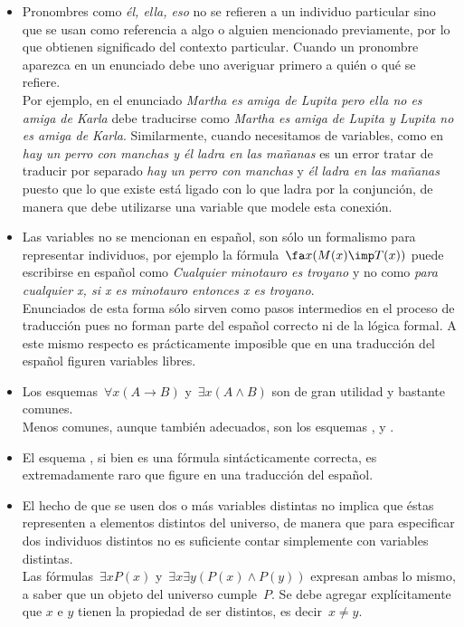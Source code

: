 \documentclass[11pt,letterpaper]{article}
\begin{document}
\begin{itemize}
 \item Pronombres como \textit{él, ella, eso} no se refieren a un individuo
  particular sino que se usan como referencia a algo o alguien mencionado 
  previamente, por lo que obtienen significado del contexto particular.
  Cuando un pronombre aparezca en un enunciado debe uno averiguar primero a 
  quién o qué se refiere. \\
  Por ejemplo, en el enunciado \textit{Martha es amiga de Lupita pero ella no 
es   amiga de Karla} debe traducirse como \textit{Martha es amiga de Lupita y 
  Lupita no es amiga de Karla}. Similarmente, cuando necesitamos de 
  variables, como en \textit{hay un perro con manchas y él ladra en las 
  mañanas} es un error tratar de traducir por separado \textit{hay un perro con
  manchas} y \textit{él ladra en las mañanas} puesto que lo que existe está
  ligado con lo que ladra por la conjunción, de manera que debe
  utilizarse una variable que modele esta conexión. 

 \item Las variables no se mencionan en español, son sólo un formalismo
  para representar individuos, por ejemplo la fórmula~$\fa x(M(x)\imp T(x))$ 
  puede escribirse en español como \textit{Cualquier minotauro es troyano} 
  y no como \textit{para cualquier x, si x es minotauro entonces x es 
  troyano}. \\
  Enunciados de esta forma sólo sirven como pasos intermedios en el proceso de 
  traducción pues no forman parte del español correcto ni de la lógica formal. 
  A este mismo respecto es prácticamente imposible que en una traducción del 
  español figuren variables libres.

 \item Los esquemas~$\forall x(A\to B)$ y~$\exists x(A\land B)$ son de gran
  utilidad y bastante comunes. \\
  Menos comunes, aunque también adecuados, son los esquemas 
  , 
   y 
  \;.

 \item El esquema , si bien es una 
  fórmula sintácticamente correcta, es extremadamente raro que figure en una
  traducción del español.
  
 \item El hecho de que se usen dos o más variables distintas no implica
  que éstas representen a elementos distintos del universo, de manera
  que para especificar dos individuos distintos no es suficiente contar
  simplemente con variables distintas.\\
  Las fórmulas~$\exists x P(x)$ y~$\exists x\exists y(P(x)\land P(y))$ expresan 
  ambas lo mismo, a saber que un objeto del universo cumple~$P$. Se debe 
  agregar explícitamente que $x$ e $y$ tienen la propiedad de ser distintos, es 
  decir~$x\ne y$.


\end{itemize}
\end{document}
